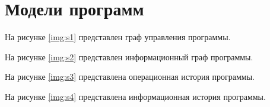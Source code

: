 \section{Модели программ}

На рисунке \ref{img:s1} представлен граф управления программы.

На рисунке \ref{img:s2} представлен информационный граф программы.

На рисунке \ref{img:s3} представлена операционная история программы.

На рисунке \ref{img:s4} представлена информационная история программы.

\begin{landscape}




\end{landscape}


